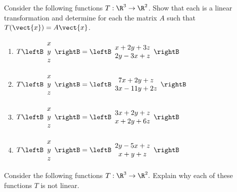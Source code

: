 \begin{enumialphparenastyle}
\begin{ex} Consider the following functions $T:\R^{3}\rightarrow \R^{2}$.
Show that each is a linear transformation and determine for each the matrix $A$ such that 
$T(\vect{x})=A\vect{x}$.

\begin{enumerate}
\item $T\leftB
\begin{array}{c}
x \\
y \\
z
\end{array}
\rightB =\leftB
\begin{array}{c}
x+2y+3z \\
2y-3x+z
\end{array}
\rightB $

\item $T\leftB
\begin{array}{c}
x \\
y \\
z
\end{array}
\rightB =\leftB
\begin{array}{c}
7x+2y+z \\
3x-11y+2z
\end{array}
\rightB $

\item $T\leftB
\begin{array}{c}
x \\
y \\
z
\end{array}
\rightB =\leftB
\begin{array}{c}
3x+2y+z \\
x+2y+6z
\end{array}
\rightB $

\item $T\leftB
\begin{array}{c}
x \\
y \\
z
\end{array}
\rightB =\leftB
\begin{array}{c}
2y-5x+z \\
x+y+z
\end{array}
\rightB $
\end{enumerate}
\end{ex}

\begin{ex} Consider the following functions $T:\R^{3}\rightarrow \R^{2}.$
Explain why each of these functions $T$ is not linear.


\end{ex}
\end{enumialphparenastyle}
